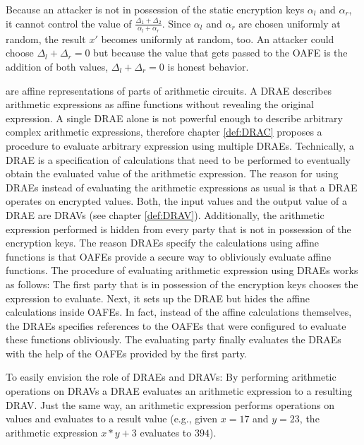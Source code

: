 Because an attacker is not in possession of the static encryption keys
$\alpha_l$ and $\alpha_r$, it cannot control the value of $\frac{\Delta_1 +
\Delta_2}{\alpha_l + \alpha_r}$. Since $\alpha_l$ and $\alpha_r$ are chosen
uniformly at random, the result $x'$ becomes uniformly at random, too. An
attacker could choose $\Delta_l + \Delta_r = 0$ but because the value that gets
passed to the OAFE is the addition of both values, $\Delta_l + \Delta_r = 0$ is
honest behavior.


%
%
\label{sec:drae}

 are affine representations of
parts of arithmetic circuits. A DRAE describes arithmetic expressions as affine
functions without revealing the original expression. A single DRAE alone is not
powerful enough to describe arbitrary complex arithmetic expressions, therefore
chapter \ref{def:DRAC} proposes a procedure to evaluate arbitrary expression
using multiple DRAEs. Technically, a DRAE is a specification of calculations
that need to be performed to eventually obtain the evaluated value of the
arithmetic expression. The reason for using DRAEs instead of evaluating the
arithmetic expressions as usual is that a DRAE operates on encrypted values.
Both, the input values and the output value of a DRAE are DRAVs (see chapter
\ref{def:DRAV}). Additionally, the arithmetic expression performed is hidden
from every party that is not in possession of the encryption keys. The reason
DRAEs specify the calculations using affine functions is that OAFEs provide
a secure way to obliviously evaluate affine functions. The procedure of
evaluating arithmetic expression using DRAEs works as follows: The first party
that is in possession of the encryption keys chooses the expression to evaluate.
Next, it sets up the DRAE but hides the affine calculations inside OAFEs. In
fact, instead of the affine calculations themselves, the DRAEs specifies
references to the OAFEs that were configured to evaluate these functions
obliviously. The evaluating party finally evaluates the DRAEs with the help of
the OAFEs provided by the first party.

To easily envision the role of DRAEs and DRAVs: By performing arithmetic
operations on DRAVs a DRAE evaluates an arithmetic expression to a resulting
DRAV\@. Just the same way, an arithmetic expression performs operations on
values and evaluates to a result value (e.g., given $x=17$ and $y=23$, the
arithmetic expression $x*y + 3$ evaluates to $394$).

